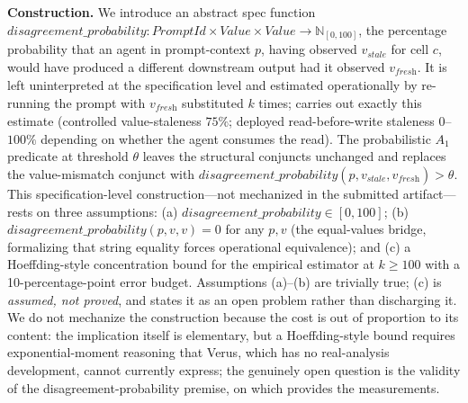 \documentclass[journal,compsoc,10pt]{IEEEtran}
\theoremstyle{definition}
\theoremstyle{remark}
\begin{document}
\medskip
\noindent\textbf{Construction.}
We introduce an abstract spec function
$\mathit{disagreement\_probability}: \mathit{PromptId} \times \mathit{Value} \times \mathit{Value} \to \mathbb{N}_{[0,100]}$,
the percentage probability that an agent in prompt-context $p$, having
observed $v_{\textit{stale}}$ for cell $c$, would have produced a
different downstream output had it observed $v_{\textit{fresh}}$. It is
left uninterpreted at the specification level and estimated
operationally by re-running the prompt with $v_{\textit{fresh}}$
substituted $k$ times;  carries out
exactly this estimate (controlled value-staleness $75\%$; deployed
read-before-write staleness $0$--$100\%$ depending on whether the agent
consumes the read). The probabilistic $A_1$ predicate at threshold
$\theta$ leaves the structural conjuncts unchanged and replaces the
value-mismatch conjunct with
$\mathit{disagreement\_probability}(p, v_{\textit{stale}}, v_{\textit{fresh}}) > \theta$.
This specification-level construction---not mechanized in the submitted
artifact---rests on three assumptions:
(a) $\mathit{disagreement\_probability} \in [0,100]$;
(b) $\mathit{disagreement\_probability}(p,v,v)=0$ for any $p,v$ (the
equal-values bridge, formalizing that string equality forces
operational equivalence); and
(c) a Hoeffding-style concentration bound for the empirical estimator
at $k \geq 100$ with a 10-percentage-point error budget. Assumptions
(a)--(b) are trivially true; (c) is \emph{assumed, not proved}, and
 states it as an open problem rather than
discharging it. We do not mechanize the construction because the cost is
out of proportion to its content: the implication itself is elementary,
but a Hoeffding-style bound requires exponential-moment reasoning that
Verus, which has no real-analysis development, cannot currently express;
the genuinely open question is the validity of the
disagreement-probability premise, on which
 provides the measurements.
\end{document}

